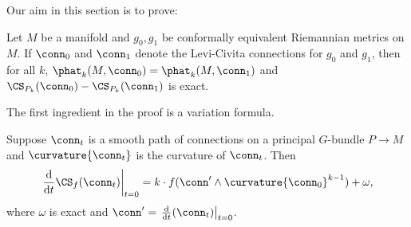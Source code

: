 Our aim in this section is to prove:
\begin{theorem}[{\cite[Theorem 4.5]{cs}}]
\label{diff_p_conformally_invariant}
Let $M$ be a manifold and $g_0,g_1$ be conformally equivalent Riemannian metrics on $M$. If $\conn_0$ and
$\conn_1$ denote the Levi-Civita connections for $g_0$ and $g_1$, then for all $k$, $\phat_k(M, \conn_0) =
\phat_k(M, \conn_1)$ and $\CS_{P_k}(\conn_0) - \CS_{P_k}(\conn_1)$ is exact.
\end{theorem}
The first ingredient in the proof is a variation formula.
\begin{lemma}
\label{variation_Chern_Simons}
Suppose $\conn_t$ is a smooth path of connections on a principal $G$-bundle $P\to M$ and $\curvature{\conn_t}$ is the
curvature of $\conn_t$. Then
\begin{equation}
	\label{var_form_CS}
	\left.\frac{\mathrm d}{\mathrm dt} \CS_f(\conn_t)\right|_{t=0} = k\cdot  f(\conn'\wedge
	\curvature{\conn_0}^{k-1}) + \omega,
\end{equation}
where $\omega$ is exact and $\conn' = \left.\frac{\mathrm d}{\mathrm dt}(\conn_t)\right|_{t=0}$.
\end{lemma}
